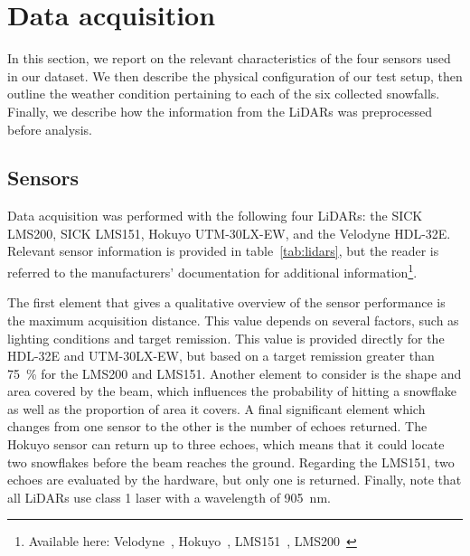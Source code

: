 \section{Data acquisition}
\label{sec:chap_lidar_data_acquisition}

In this section, we report on the relevant characteristics of the four sensors used in our dataset. We then describe the physical configuration of our test setup, then outline the weather condition pertaining to each of the six collected snowfalls. Finally, we describe how the information from the LiDARs was preprocessed before analysis.

\subsection{Sensors}

Data acquisition was performed with the following four LiDARs: the SICK LMS200, SICK LMS151, Hokuyo UTM-30LX-EW, and the Velodyne HDL-32E. Relevant sensor information is provided in table~\ref{tab:lidars}, but the reader is referred to the manufacturers' documentation for additional information\footnote{Available here: Velodyne~\cite{VelodyneManual}, Hokuyo~\cite{UTMDatasheet}, LMS151~\cite{LMS151Datasheet}, LMS200~\cite{LMS200Manual}}.

The first element that gives a qualitative overview of the sensor performance is the maximum acquisition distance. This value depends on several factors, such as lighting conditions and target remission. This value is provided directly for the HDL-32E and UTM-30LX-EW, but based on a target remission greater than \SI{75}{\percent} for the LMS200 and LMS151. Another element to consider is the shape and area covered by the beam, which influences the probability of hitting a snowflake as well as the proportion of area it covers. A final significant element which changes from one sensor to the other is the number of echoes returned. The Hokuyo sensor can return up to three echoes, which means that it could locate two snowflakes before the beam reaches the ground. Regarding the LMS151, two echoes are evaluated by the hardware, but only one is returned. Finally, note that all LiDARs use class 1 laser with a wavelength of \SI{905}{\nano\meter}.


